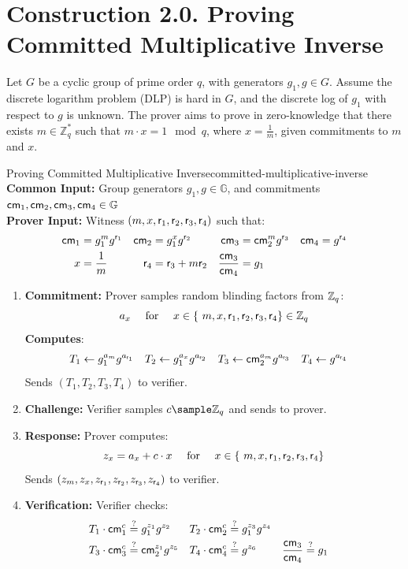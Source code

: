 \section{Construction 2.0. Proving Committed Multiplicative Inverse}
Let $G$ be a cyclic group of prime order $q$, with generators $g_1, g \in G$. Assume the discrete logarithm problem (DLP) is hard in $G$, and the discrete log of $g_1$ with respect to $g$ is unknown.
The prover aims to prove in zero-knowledge that there exists $m \in \mathbb{Z}_q^*$ such that $m \cdot x = 1 \mod q$, where $x = \frac{1}{m}$, given commitments to $m$ and $x$.


\begin{protocol}{Proving Committed Multiplicative Inverse}{committed-multiplicative-inverse}\label{pok-committed-multiplicative-inverse}
\textbf{Common Input:} Group generators $g_1, g \in \mathbb{G}$, and commitments $\mathsf{cm}_1, \mathsf{cm}_2, \mathsf{cm}_3, \mathsf{cm}_4 \in \mathbb{G}$\\
\textbf{Prover Input:} Witness $(m, x, \mathsf{r}_1, \mathsf{r}_2, \mathsf{r}_3, \mathsf{r}_4)$ such that:
    \begin{align*}
        \mathsf{cm}_1 &= g_1^m g^{\mathsf{r}_1}     &    \mathsf{cm}_2 &= g_1^x g^{\mathsf{r}_2}  &   \mathsf{cm}_3 &= \mathsf{cm}_2^m g^{\mathsf{r}_3} & \mathsf{cm}_4 &= g^{\mathsf{r}_4}\\
         x &= \frac{1}{m}     &   \mathsf{r}_4 &= \mathsf{r}_3 + m \mathsf{r}_2 & \frac{\mathsf{cm}_3}{\mathsf{cm}_4} &= g_1
    \end{align*}
\begin{enumerate}
    \item \textbf{Commitment:} Prover samples random blinding factors from $\mathbb{Z}_q$:
       \[
        a_x \quad \text{ for } \quad x \in \{\ m, x, \mathsf{r}_1, \mathsf{r}_2, \mathsf{r}_3, \mathsf{r}_4\} \in \mathbb{Z}_q
        \]
    \textbf{Computes}:
    \begin{align*}
        T_1 &\gets g_1^{a_m} g^{a_{\mathsf{r}_1}}  &   T_2 &\gets g_1^{a_x} g^{a_{\mathsf{r}_2}}     &   T_3 &\gets \mathsf{cm}_2^{a_m} g^{a_{\mathsf{r}_3}} & T_4 &\gets g^{a_{\mathsf{r}_4}}
    \end{align*}
    Sends $(T_1, T_2, T_3, T_4)$ to verifier.
    
    \item \textbf{Challenge:} Verifier samples $c \sample \mathbb{Z}_q$ and sends to prover.
    
    \item \textbf{Response:} Prover computes:
    \[
    z_x = a_x + c \cdot x \quad \text{ for } \quad x \in \{\ m, x, \mathsf{r}_1, \mathsf{r}_2, \mathsf{r}_3, \mathsf{r}_4\} 
    \]
    Sends $(z_m, z_x, z_{\mathsf{r}_1}, z_{\mathsf{r}_2}, z_{\mathsf{r}_3}, z_{\mathsf{r}_4})$ to verifier.
    
    \item \textbf{Verification:} Verifier checks:
    \begin{align*}
         T_1 \cdot \mathsf{cm}_1^c &\stackrel{?}{=}  g_1^{z_1} g^{z_2}
        & 
         T_2 \cdot \mathsf{cm}_2^c &\stackrel{?}{=}  g_1^{z_3} g^{z_4}\\
        T_3 \cdot \mathsf{cm}_3^c &\stackrel{?}{=} \mathsf{cm}_2^{z_1} g^{z_5}
        &
        T_4 \cdot \mathsf{cm}_4^c &\stackrel{?}{=}  g^{z_6} 
        &
        \frac{\mathsf{cm}_3}{\mathsf{cm}_4} &\stackrel{?}{=} g_1
    \end{align*}
\end{enumerate}
\end{protocol}
